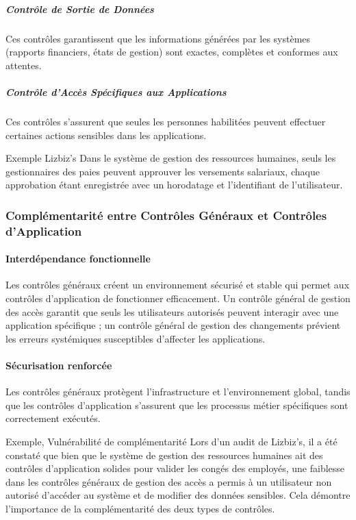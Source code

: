 \subparagraph{Contrôle de Sortie de Données}
Ces contrôles garantissent que les informations générées par les systèmes (rapports
financiers, états de gestion) sont exactes, complètes et conformes aux attentes.

\subparagraph{Contrôle d'Accès Spécifiques aux Applications}
Ces contrôles s'assurent que seules les personnes habilitées peuvent effectuer
certaines actions sensibles dans les applications.

\begin{boxlizbiz}{Exemple Lizbiz's}
Dans le système de gestion des ressources humaines, seuls les gestionnaires des paies
peuvent approuver les versements salariaux, chaque approbation étant enregistrée avec
un horodatage et l'identifiant de l'utilisateur.
\end{boxlizbiz}

\subsubsection{Complémentarité entre Contrôles Généraux et Contrôles d'Application}

\paragraph{Interdépendance fonctionnelle}
Les contrôles généraux créent un environnement sécurisé et stable qui permet aux
contrôles d'application de fonctionner efficacement. Un contrôle général de gestion
des accès garantit que seuls les utilisateurs autorisés peuvent interagir avec une
application spécifique ; un contrôle général de gestion des changements prévient les
erreurs systémiques susceptibles d'affecter les applications.

\paragraph{Sécurisation renforcée}
Les contrôles généraux protègent l'infrastructure et l'environnement global, tandis
que les contrôles d'application s'assurent que les processus métier spécifiques sont
correctement exécutés.

\begin{boxlizbiz}{Exemple, Vulnérabilité de complémentarité}
Lors d'un audit de Lizbiz's, il a été constaté que bien que le système de gestion des
ressources humaines ait des contrôles d'application solides pour valider les congés des
employés, une faiblesse dans les contrôles généraux de gestion des accès a permis à
un utilisateur non autorisé d'accéder au système et de modifier des données sensibles.
Cela démontre l'importance de la complémentarité des deux types de contrôles.
\end{boxlizbiz}


